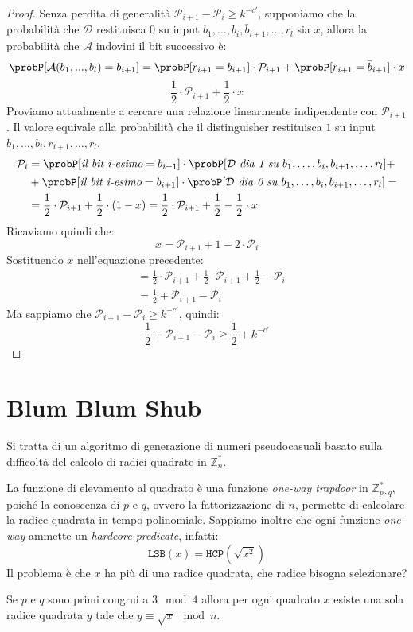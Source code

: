 \begin{proof}
  Senza perdita di generalità $\mathcal{P}_{i+1} - \mathcal{P}_i \geq k^{-c'}$,
  supponiamo che la probabilità che $\mathcal{D}$ restituisca $0$ su input $b_1, \dots, b_i, \bar{b}_{i+1}, \dots, r_l$ sia $x$,
  allora la probabilità che $\mathcal{A}$ indovini il bit successivo è:
  \[
    \probP[\mathcal{A}(b_1,...,b_l) = b_{i+1}] = \probP[r_{i+1} = b_{i+1}] \cdot \mathcal{P}_{i+1} + \probP[r_{i+1} = \bar{b}_{i+1}] \cdot x
  \]
  \[
    \frac{1}{2}\cdot \mathcal{P}_{i+1} + \frac{1}{2}\cdot x
  \]
  Proviamo attualmente a cercare una relazione linearmente indipendente con $\mathcal{P}_{i+1}$. Il valore 
  equivale alla probabilità che il distinguisher restituisca $1$ su input $b_1, \dots, b_i, r_{i+1}, \dots, r_l$.
  \begin{align*}
    \mathcal{P}_i &= \probP[\textit{il bit i-esimo} = b_{i+1}] \cdot \probP[\mathcal{D} \textit{ dia 1 su } b_1, \dots, b_i, b_{i+1}, \dots, r_l] +\\
    &+ \probP[\textit{il bit i-esimo} = \bar{b}_{i+1}] \cdot \probP[\mathcal{D} \textit{ dia 0 su } b_1, \dots, b_i, \bar{b}_{i+1}, \dots, r_l] =\\
    &= \frac{1}{2} \cdot \mathcal{P}_{i+1} + \frac{1}{2} \cdot (1 - x) = \frac{1}{2} \cdot \mathcal{P}_{i+1} + \frac{1}{2} - \frac{1}{2} \cdot x
  \end{align*}
  Ricaviamo quindi che:
  \[
    x = \mathcal{P}_{i+1} + 1 - 2 \cdot \mathcal{P}_i
  \]
  Sostituendo $x$ nell'equazione precedente:
  \begin{align*}
    &= \frac{1}{2} \cdot \mathcal{P}_{i+1} + \frac{1}{2} \cdot \mathcal{P}_{i+1} + \frac{1}{2} - \mathcal{P}_i\\
    &= \frac{1}{2} + \mathcal{P}_{i+1} - \mathcal{P}_i  
  \end{align*}
  Ma sappiamo che $\mathcal{P}_{i+1} - \mathcal{P}_i \geq k^{-c'}$, quindi:
  \[
    \frac{1}{2} + \mathcal{P}_{i+1} - \mathcal{P}_i \geq \frac{1}{2} + k^{-c'}
  \]
\end{proof}
\section{Blum Blum Shub}
Si tratta di un algoritmo di generazione di numeri pseudocasuali 
basato sulla difficoltà del calcolo di radici quadrate in $\mathbb{Z}_n^*$.

La funzione di elevamento al quadrato è una funzione \textit{one-way trapdoor} in $\mathbb{Z}_{p\cdot q}^*$,
poiché la conoscenza di $p$ e $q$, ovvero la fattorizzazione di $n$,
permette di calcolare la radice quadrata in tempo polinomiale.
Sappiamo inoltre che ogni funzione \textit{one-way} ammette un \textit{hardcore predicate}, infatti:
\[
  \texttt{LSB}(x) = \texttt{HCP}(\sqrt{x^2})
\]
Il problema è che $x$ ha più di una radice quadrata, che radice bisogna selezionare?
\begin{theorem}
  Se $p$ e $q$ sono primi congrui a $3 \mod 4$ allora per ogni quadrato $x$ 
  esiste una sola radice quadrata $y$ tale che $y \equiv \sqrt{x} \mod n$.
\end{theorem}

